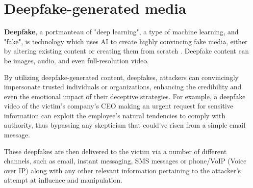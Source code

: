



\section{Deepfake-generated media}
\begin{comment}
    
    -

\end{comment}

\textbf{Deepfake}, a portmanteau of "deep learning", a type of machine learning, and "fake", is technology which uses AI to create highly convincing fake media, either by altering existing content or creating them from scratch \citep{mirskyTheCreationAndDetectionOfDeepfakes2021}. Deepfake content can be images, audio, and even full-resolution video.

By utilizing deepfake-generated content, deepfakes, attackers can convincingly impersonate trusted individuals or organizations, enhancing the credibility and even the emotional impact of their deceptive strategies. For example, a deepfake video of the victim's company's CEO making an urgent request for sensitive information can exploit the employee's natural tendencies to comply with authority, thus bypassing any skepticism that could've risen from a simple email message.

These deepfakes are then delivered to the victim via a number of different channels, such as email, instant messaging, SMS messages or phone/VoIP (Voice over IP) along with any other relevant information pertaining to the attacker's attempt at influence and manipulation.

